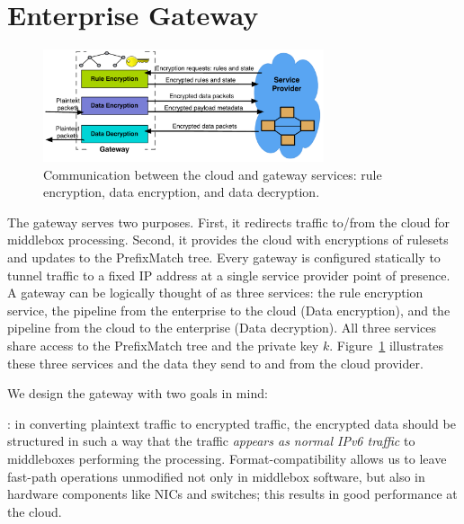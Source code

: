 
\section{Enterprise Gateway}

\label{sec:gateway}

\begin{figure}[t]
  \centering
  \includegraphics[width=3.25in]{fig/gateway2cloud}
  \caption[]{\label{fig:gatewaymeta} Communication between the cloud and gateway services: rule encryption, data encryption, and data decryption.} 
\end{figure}






The gateway serves two purposes. First, it redirects traffic to/from the cloud for middlebox processing. Second, it provides the cloud with encryptions of rulesets and updates to the PrefixMatch tree.
Every gateway is configured statically to tunnel traffic to a fixed IP address at a single service provider point of presence.
A gateway can be logically thought of as three services: the rule encryption service, the pipeline from the enterprise to the cloud (Data encryption), and the pipeline from the cloud to the enterprise (Data decryption). 
All three services share access to the PrefixMatch tree and the private key $k$.
Figure~\ref{fig:gatewaymeta} illustrates  these three services and the data they send to and from the cloud provider.

We design the gateway with two goals in mind: 

: in converting plaintext traffic to encrypted traffic, the encrypted data should be structured in such a way that the traffic {\it appears as normal IPv6 traffic} to middleboxes performing the processing. Format-compatibility allows us to leave fast-path operations unmodified not only in middlebox software, but also in hardware components like NICs and switches; this results in good performance at the cloud.

